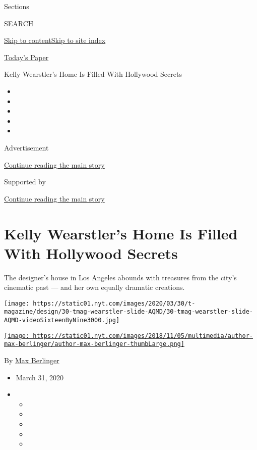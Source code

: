 Sections

SEARCH

\protect\hyperlink{site-content}{Skip to
content}\protect\hyperlink{site-index}{Skip to site index}

\href{https://myaccount.nytimes.com/auth/login?response_type=cookie\&client_id=vi}{}

\href{https://www.nytimes.com/section/todayspaper}{Today's Paper}

Kelly Wearstler's Home Is Filled With Hollywood Secrets

\begin{itemize}
\item
\item
\item
\item
\item
\end{itemize}

Advertisement

\protect\hyperlink{after-top}{Continue reading the main story}

Supported by

\protect\hyperlink{after-sponsor}{Continue reading the main story}

\hypertarget{kelly-wearstlers-home-is-filled-with-hollywood-secrets}{%
\section{Kelly Wearstler's Home Is Filled With Hollywood
Secrets}\label{kelly-wearstlers-home-is-filled-with-hollywood-secrets}}

The designer's house in Los Angeles abounds with treasures from the
city's cinematic past --- and her own equally dramatic creations.

\texttt{[image: https://static01.nyt.com/images/2020/03/30/t-magazine/design/30-tmag-wearstler-slide-AQMD/30-tmag-wearstler-slide-AQMD-videoSixteenByNine3000.jpg]}

\href{https://www.nytimes.com/by/max-berlinger}{\texttt{[image: https://static01.nyt.com/images/2018/11/05/multimedia/author-max-berlinger/author-max-berlinger-thumbLarge.png]}}

By \href{https://www.nytimes.com/by/max-berlinger}{Max Berlinger}

\begin{itemize}
\item
  March 31, 2020
\item
  \begin{itemize}
  \item
  \item
  \item
  \item
  \item
  \end{itemize}
\end{itemize}

